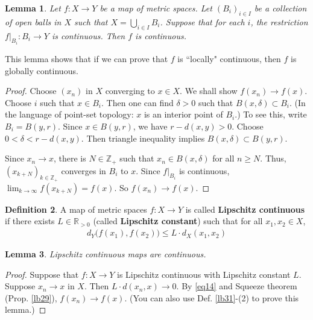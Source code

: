 \documentclass[12pt,b5paper,notitlepage]{article}
\theoremstyle{definition}
\newtheorem{df}{Definition}[section]
\theoremstyle{plain}
\newtheorem{lm}[df]{Lemma}
\newcommand{\Zbb}{\mathbb Z}
\newcommand{\Rbb}{\mathbb R}
\numberwithin{equation}{section}
\begin{document}
\begin{lm}\label{lb30}
Let $f:X\rightarrow Y$ be a map of metric spaces.  Let $(B_i)_{i\in I}$ be a collection of open balls in $X$ such that $X=\bigcup_{i\in I}B_i$. Suppose that for each $i$, the restriction $f|_{B_i}:B_i\rightarrow Y$ is continuous. Then $f$ is continuous. 
\end{lm}

This lemma shows that if we can prove that $f$ is ``locally" continuous, then $f$ is globally continuous. 

\begin{proof}
Choose $(x_n)$ in $X$ converging to $x\in X$. We shall show $f(x_n)\rightarrow f(x)$. Choose $i$ such that $x\in B_i$. Then one can find $\delta>0$ such that $B(x,\delta)\subset B_i$. (In the language of point-set topology: $x$ is an interior point of $B_i$.) To see this, write $B_i=B(y,r)$. Since $x\in B(y,r)$, we have $r-d(x,y)>0$. Choose $0<\delta<r-d(x,y)$. Then triangle inequality implies $B(x,\delta)\subset B(y,r)$. 

Since $x_n\rightarrow x$, there is $N\in\Zbb_+$ such that $x_n\in B(x,\delta)$ for all $n\geq N$. Thus, $(x_{k+N})_{k\in\Zbb_+}$ converges in $B_i$ to $x$. Since $f|_{B_i}$ is continuous, $\lim_{k\rightarrow\infty} f(x_{k+N})=f(x)$. So $f(x_n)\rightarrow f(x)$.
\end{proof}







\begin{df}
A map of metric spaces $f:X\rightarrow Y$ is called  \textbf{Lipschitz continuous} if there exists $L\in\Rbb_{>0}$ (called \textbf{Lipschitz constant})  such that for all $x_1,x_2\in X$,
\begin{align}
d_Y\big(f(x_1),f(x_2) \big)\leq L\cdot d_X(x_1,x_2) \label{eq14}
\end{align}
\end{df}

\begin{lm}\label{lb34}
Lipschitz continuous maps are continuous. 
\end{lm}

\begin{proof}
Suppose that $f:X\rightarrow Y$ is Lipschitz continuous with Lipschitz constant $L$. Suppose $x_n\rightarrow x$ in $X$. Then $L\cdot d(x_n,x)\rightarrow 0$. By \eqref{eq14} and Squeeze theorem (Prop. \ref{lb29}), $f(x_n)\rightarrow f(x)$. (You can also use Def. \ref{lb31}-(2) to prove this lemma.)
\end{proof}
\end{document}
